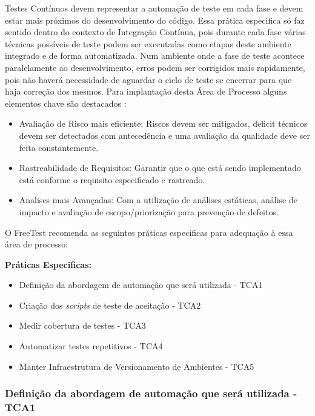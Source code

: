 Testes Contínuos devem representar a automação de teste em cada fase e devem estar mais próximos do desenvolvimento do código. Essa prática especifica só faz sentido dentro do contexto de Integração Contínua, pois durante cada fase várias técnicas possíveis de teste podem ser executadas como etapas deste ambiente integrado e de forma automatizada. Num ambiente onde a fase de teste acontece paralelamente ao desenvolvimento, erros podem ser corrigidos mais rapidamente, pois não haverá necessidade de aguardar o ciclo de teste se encerrar para que haja correção dos mesmos. Para implantação desta Área de Processo alguns elementos chave são destacados \cite{ContinuousTestIT}:

\begin{itemize}
	\item Avaliação de Risco mais eficiente: Riscos devem ser mitigados, deficit técnicos devem ser detectados com antecedência e uma avaliação da qualidade deve ser feita constantemente.  
	\item Rastreabilidade de Requisitos: Garantir que o que está sendo implementado está conforme o requisito especificado e rastreado.
	\item Analises mais Avançadas: Com a utilização de análises estáticas, análise de impacto e avaliação de escopo/priorização para prevenção de defeitos.
\end{itemize}


O FreeTest recomenda as seguintes práticas especificas para adequação à essa área de processo:

\textbf{Práticas Especificas:}

\begin{itemize}    
    \item Definição da abordagem de automação que será utilizada - TCA1
    \item Criação dos \textit{scripts} de teste de aceitação - TCA2
    \item Medir cobertura de testes - TCA3
    \item Automatizar testes repetitivos - TCA4
    \item Manter Infraestrutura de Versionamento de Ambientes - TCA5
\end{itemize}

\subsubsection{Definição da abordagem de automação que será utilizada - TCA1}
\label{sec:tca1}

